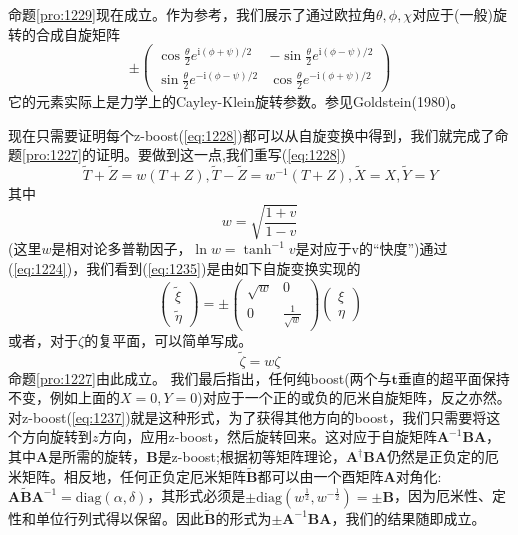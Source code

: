 \documentclass[utf8]{ctexbook}
\numberwithin{equation}{section}
\begin{document}
命题\ref{pro:1229}现在成立。作为参考，我们展示了通过欧拉角$\theta,\phi,\chi$对应于(一般)旋转的合成自旋矩阵
\begin{equation}
    \pm \begin{pmatrix}
        \cos\frac{\theta}{2} e^{\mathrm{i}(\phi+\psi)/2}&-\sin\frac{\theta}{2} e^{\mathrm{i}(\phi-\psi)/2}\\\sin\frac{\theta}{2} e^{-\mathrm{i}(\phi-\psi)/2}&\cos\frac{\theta}{2} e^{-\mathrm{i}(\phi+\psi)/2}
    \end{pmatrix}
\end{equation}
它的元素实际上是力学上的Cayley-Klein旋转参数。参见Goldstein(1980)。

现在只需要证明每个z-boost(\ref{eq:1228})都可以从自旋变换中得到，我们就完成了命题\ref{pro:1227}的证明。要做到这一点,我们重写(\ref{eq:1228})
\begin{equation}
    \tilde{T}+\tilde{Z} = w{(T+Z)},\tilde{T}-\tilde{Z} = w^{-1}({T+Z}), \tilde{X} = X,  \tilde{Y}=Y\label{eq:1235}
\end{equation}
其中
\begin{equation}
    w=\sqrt{\frac{1+v}{1-v}}
\end{equation}
(这里$w$是相对论多普勒因子，$\ln w = \tanh^{-1} v$是对应于v的“快度”)通过(\ref{eq:1224})，我们看到(\ref{eq:1235})是由如下自旋变换实现的
\begin{equation}
    \begin{pmatrix}
        \tilde{\xi}\\\tilde{\eta}
    \end{pmatrix}=\pm \begin{pmatrix}
        \sqrt{w}&0\\0&\frac{1}{\sqrt{w}}
    \end{pmatrix}\begin{pmatrix}
        \xi\\\eta
    \end{pmatrix}\label{eq:1237}
\end{equation}
或者，对于$\zeta$的复平面，可以简单写成。
\begin{equation}
    \tilde{\zeta}=w\zeta \label{eq:1238}
\end{equation}
命题\ref{pro:1227}由此成立。
我们最后指出，任何纯boost(两个与$\mathbf{t}$垂直的超平面保持不变，例如上面的$X =0, Y =0$)对应于一个正的或负的厄米自旋矩阵，反之亦然。对z-boost(\ref{eq:1237})就是这种形式，为了获得其他方向的boost，我们只需要将这个方向旋转到$z$方向，应用z-boost，然后旋转回来。这对应于自旋矩阵$\mathbf{A}^{-1}\mathbf{B}\mathbf{A}$，其中$\mathbf{A}$是所需的旋转，$\mathbf{B}$是z-boost;根据初等矩阵理论，$\mathbf{A}^\dagger \mathbf{B}\mathbf{A}$仍然是正负定的厄米矩阵。相反地，任何正负定厄米矩阵$\tilde{\mathbf{B}}$都可以由一个酉矩阵$\mathbf{A}$对角化:$\mathbf{A}\tilde{\mathbf{B}}\mathbf{A}^{-1}= \text{diag}(\alpha,\delta)$，其形式必须是$\pm \text{diag}(w^{\frac12},w^{-\frac12})=±\mathbf{B}$，因为厄米性、定性和单位行列式得以保留。因此$\tilde{\mathbf{B}}$的形式为$\pm \mathbf{A}^{-1}\mathbf{B}\mathbf{A}$，我们的结果随即成立。
\end{document}
